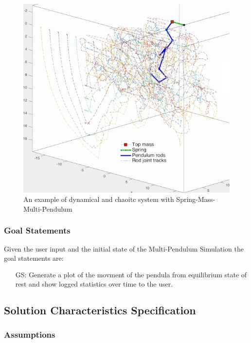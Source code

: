 \documentclass[12pt]{article}
\newcounter{goalnum} %
\begin{document}
\begin{figure}[H]
	\centering
	\includegraphics[width=430px]{multi-pend.jpg}
	\caption{An example of dynamical and chaoitc system with Spring-Mass-Multi-Pendulum}
	\label{fig:maxresdefault}
\end{figure}

\subsubsection{Goal Statements}

\noindent Given the user input and the initial state of the Multi-Pendulum Simulation the goal statements are:

\begin{itemize}

\item[GS\refstepcounter{goalnum}\thegoalnum:] Generate a plot of 
  the movment of the pendula from equilibrium state of rest and show logged statistics over time to the user.
\end{itemize}


\newpage

\subsection{Solution Characteristics Specification}

\subsubsection{Assumptions}
\end{document}
